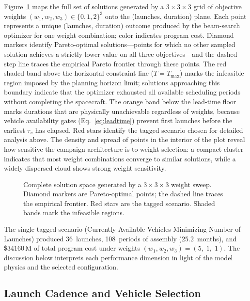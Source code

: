 Figure~\ref{fig:solution_space} maps the full set of solutions
generated by a $3 \times 3 \times 3$ grid of objective weights
$(w_1, w_2, w_3) \in \{0, 1, 2\}^3$ onto the
(launches, duration) plane.
Each point represents a unique (launches, duration) outcome
produced by the beam-search optimizer for one weight
combination; color indicates program cost.
Diamond markers identify Pareto-optimal solutions---points
for which no other sampled solution achieves a strictly
lower value on all three objectives---and the dashed step line
traces the empirical Pareto frontier through these points.
The red shaded band above the horizontal constraint line
($T = T_{\max}$) marks the infeasible region imposed by the
planning horizon limit; solutions approaching this boundary
indicate that the optimizer exhausted all available scheduling
periods without completing the spacecraft.
The orange band below the lead-time floor marks durations that
are physically unachievable regardless of weights, because
vehicle availability gates (Eq.~\ref{eq:leadtime}) prevent
first launches before the earliest $\tau_v$ has elapsed.
Red stars identify the tagged
scenario
chosen for detailed analysis above.
The density and spread of points in the interior of the plot
reveal how sensitive the campaign architecture is to weight
selection: a compact cluster indicates that most weight
combinations converge to similar solutions, while a widely
dispersed cloud shows strong weight sensitivity.

\begin{figure}[htbp]
  \centering
  \resizebox{0.85\textwidth}{!}{}
  \caption{Complete solution space generated by a
           $3{\times}3{\times}3$ weight sweep.
           Diamond markers are Pareto-optimal points;
           the dashed line traces the empirical frontier.
           Red stars are the tagged
           scenario.
           Shaded bands mark the infeasible regions.}
  \label{fig:solution_space}
\end{figure}


The single tagged scenario
(Currently Available Vehicles Minimizing Number of Launches)
produced 36~launches,
108~periods of assembly
(25.2~months), and
\$34160\,M of total
program cost under weights
$(w_1, w_2, w_3) =
(5,\;
 1,\;
 1)$.
The discussion below interprets each performance dimension in light
of the model physics and the selected configuration.

\subsection{Launch Cadence and Vehicle Selection}

